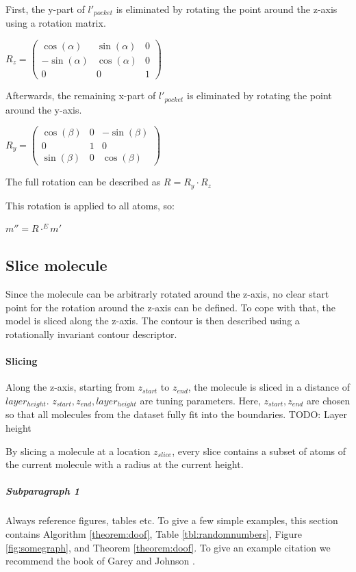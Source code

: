 First, the y-part of $l'_{pocket}$ is eliminated by rotating the point around the z-axis using a rotation matrix.

$
R_z =
\begin{pmatrix}
  \cos(\alpha) & \sin(\alpha) & 0 \\
  -\sin(\alpha) & \cos(\alpha) & 0 \\
  0 & 0 & 1
\end{pmatrix}
$

Afterwards, the remaining x-part of $l'_{pocket}$ is eliminated by rotating the point around the y-axis.

$
R_y =
\begin{pmatrix}
  \cos(\beta) & 0 & -\sin(\beta) \\
  0 & 1 & 0 \\
  \sin(\beta) & 0 & \cos(\beta) 
\end{pmatrix}
$

The full rotation can be described as $R = R_y \cdot R_z$

This rotation is applied to all atoms, so:

$m'' = R \cdot^E m'$


\subsection{Slice molecule}

Since the molecule can be arbitrarly rotated around the z-axis, no clear start point for the rotation around the z-axis can be defined.
To cope with that, the model is sliced along the z-axis. 
The contour is then described using a rotationally invariant contour descriptor.

\paragraph{Slicing}

Along the z-axis, starting from $z_{start}$ to $z_{end}$, the molecule is sliced in a distance of $layer_{height}$.
$z_{start}, z_{end}, layer_{height}$ are tuning parameters. 
Here, $z_{start}, z_{end}$ are chosen so that all molecules from the dataset fully fit into the boundaries.
TODO: Layer height %

By slicing a molecule at a location $z_{slice}$, every slice contains a subset of atoms of the current molecule with a radius at the current height.


\subparagraph{Subparagraph 1} Always reference figures, tables etc. To give a few simple examples, this section contains Algorithm \ref{theorem:doof}, Table \ref{tbl:randomnumbers}, Figure \ref{fig:somegraph}, and Theorem \ref{theorem:doof}. To give an example citation we recommend the book of Garey and Johnson \cite{gj-ci-79}.

